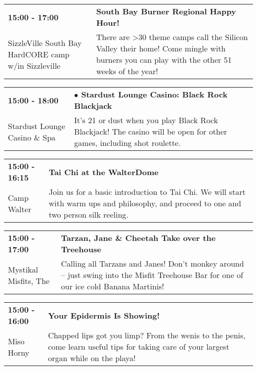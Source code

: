 \begin{tabular}{ p{1in} p{2.2in} }
    \textbf{15:00 - 17:00} & \textbf{South Bay Burner Regional Happy Hour! } \\
    SizzleVille \newline South Bay HardCORE camp w/in Sizzleville & There are >30 theme camps call the Silicon Valley their home! Come mingle with burners you can play with the other 51 weeks of the year! \\
    \hline 
\end{tabular}
    
\begin{tabular}{ p{1in} p{2.2in} }
    \textbf{15:00 - 18:00} & \textbf{$\bullet$	Stardust Lounge Casino: Black Rock Blackjack } \\
    Stardust Lounge Casino \& Spa \newline  & It's 21 or dust when you play Black Rock Blackjack! The casino will be open for other games, including shot roulette. \\
    \hline 
\end{tabular}
    
\begin{tabular}{ p{1in} p{2.2in} }
    \textbf{15:00 - 16:15} & \textbf{Tai Chi at the WalterDome} \\
    Camp Walter \newline  & Join us for a basic introduction to Tai Chi. We will start with warm ups and philosophy, and proceed to one and two person silk reeling. \\
    \hline 
\end{tabular}
    
\begin{tabular}{ p{1in} p{2.2in} }
    \textbf{15:00 - 17:00} & \textbf{Tarzan, Jane \& Cheetah Take over the Treehouse} \\
    Mystikal Misfits, The \newline  & Calling all Tarzans and Janes!   Don't monkey around -- just swing into the Misfit Treehouse Bar for one of our ice cold Banana Martinis! \\
    \hline 
\end{tabular}
    
\begin{tabular}{ p{1in} p{2.2in} }
    \textbf{15:00 - 16:00} & \textbf{Your Epidermis Is Showing!} \\
    Miso Horny \newline  & Chapped lips got you limp? From the wenis to the penis, come learn useful tips for taking care of your largest organ while on the playa! \\
    \hline 
\end{tabular}
    
